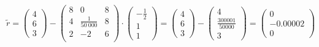\documentclass[12pt]{scrartcl}
\begin{document}
\begin{enumAlph}
\begin{itemize}
    \[
    \tilde{r}=\begin{pmatrix}
        4 \\ 6 \\ 3
    \end{pmatrix} -
    \begin{pmatrix}
        8 & 0                   & 8 \\
        4 & \frac{1}{50 \ 000}  & 8 \\
        2 & -2                  & 6 \\
    \end{pmatrix} \cdot \begin{pmatrix}
        -\frac{1}{2} \\ 1 \\ 1
    \end{pmatrix} = \begin{pmatrix}
        4 \\ 6 \\ 3
    \end{pmatrix} - \begin{pmatrix}
        4 \\ \frac{300001}{50000} \\ 3
    \end{pmatrix} = \begin{pmatrix}
        0 \\ -0.00002 \\ 0
    \end{pmatrix}
    \]
    
    \end{itemize}       



\end{enumAlph}
\end{document}
